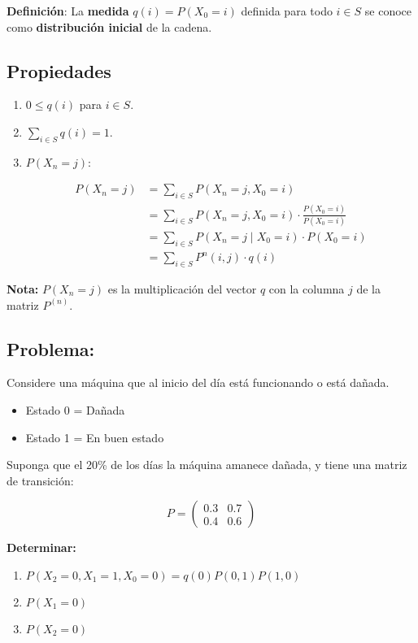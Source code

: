 \documentclass[12pt,a4paper]{article}
\begin{document}
\textbf{Definición}: La \textbf{medida} $q(i) = P(X_0 = i)$ definida para todo $i \in S$ se conoce como \textbf{distribución inicial} de la cadena.

\subsection*{Propiedades}

\begin{enumerate}
    \item $0 \leq q(i)$ para $i \in S$.
    \item $\sum_{i \in S} q(i) = 1$.
    \item $P(X_n = j)$:

    \begin{align*}
    P(X_n = j) &= \sum_{i \in S} P(X_n = j, X_0 = i) \\
    &= \sum_{i \in S} P(X_n = j, X_0 = i) \cdot \frac{P(X_0 = i)}{P(X_0 = i)} \\
    &= \sum_{i \in S} P(X_n = j \mid X_0 = i) \cdot P(X_0 = i) \\
    &= \sum_{i \in S} P^n(i,j) \cdot q(i)
    \end{align*}
\end{enumerate}

\textbf{Nota:} $P(X_n = j)$ es la multiplicación del vector $q$ con la columna $j$ de la matriz $P^{(n)}$.

\subsection*{Problema:}
Considere una máquina que al inicio del día está funcionando o está dañada.

\begin{itemize}
    \item Estado 0 = Dañada
    \item Estado 1 = En buen estado
\end{itemize}

Suponga que el 20\% de los días la máquina amanece dañada, y tiene una matriz de transición:

\begin{equation*}
P = \begin{pmatrix}
0.3 & 0.7 \\
0.4 & 0.6
\end{pmatrix}
\end{equation*}

\textbf{Determinar:}
\begin{enumerate}
    \item $P(X_2 = 0, X_1 = 1, X_0 = 0) = q(0) P(0,1) P(1,0)$
    \item $P(X_1 = 0)$
    \item $P(X_2 = 0)$
\end{enumerate}
\end{document}

